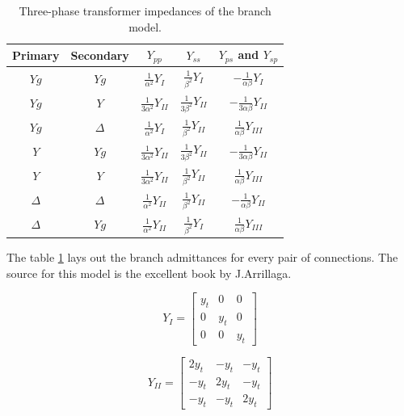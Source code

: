 \documentclass[a4paper,twoside,fleqn]{tufte-book}
\begin{document}
\begin{table}[h!]
\begin{center}
\begin{tabular}{ccccc}
\toprule
Primary & Secondary & $Y_{pp}$  & $Y_{ss}$ & $Y_{ps}$ and $Y_{sp}$\\
\midrule
 $Yg$ & $Yg$ 			& $\frac{1}{\alpha^2}Y_I$ 				& $\frac{1}{\beta^2}Y_I$ 		& $-\frac{1}{\alpha\beta}Y_I$\\
 $Yg$ & $Y$ 			& $\frac{1}{3\alpha^2}Y_{II}$			& $\frac{1}{3\beta^2}Y_{II}$	& $-\frac{1}{3\alpha\beta}Y_{II}$	\\
 $Yg$ & $\Delta$  		& $\frac{1}{\alpha^2}Y_I$ 				& $\frac{1}{\beta^2}Y_{II}$ 	& $\frac{1}{\alpha\beta}Y_{III}$	 \\
 $Y$ & $Yg$ 			& $\frac{1}{3\alpha^2}Y_{II}$			& $\frac{1}{3\beta^2}Y_{II}$	& $-\frac{1}{3\alpha\beta}Y_{II}$ \\
 $Y$ & $Y$  			& $\frac{1}{3\alpha^2}Y_{II}$			& $\frac{1}{\beta^2}Y_{II}$ 	& $\frac{1}{\alpha\beta}Y_{III}$	 \\
 $\Delta$ & $\Delta$ 	& $\frac{1}{\alpha^2}Y_{II}$			& $\frac{1}{\beta^2}Y_{II}$		& $-\frac{1}{\alpha\beta}Y_{II}$\\
 $\Delta$ & $Yg$ 		& $\frac{1}{\alpha^2}Y_{II}$			& $\frac{1}{\beta^2}Y_{I}$		& $\frac{1}{\alpha\beta}Y_{III}$\\
\bottomrule
\end{tabular}
\end{center}
  \caption{Three-phase transformer impedances of the branch model.}
  \label{transfoemer_impedances_table}
\end{table}

The table \ref{transfoemer_impedances_table} lays out the branch admittances for every pair of connections. The source for this model is the excellent book by J.Arrillaga\cite{arrillaga1990computer}.

\begin{equation}
Y_{I} = \left[ \begin{array}{ccc}
y_t & 0 &  0 \\
0 & y_t & 0 \\ 
0 & 0 & y_t
\end{array} \right] 
\end{equation}

\begin{equation}
Y_{II} = \left[ \begin{array}{ccc}
2y_t & -y_t &  -y_t \\
-y_t & 2y_t & -y_t \\  
-y_t & -y_t & 2y_t
\end{array} \right] 
\end{equation}
\end{document}
